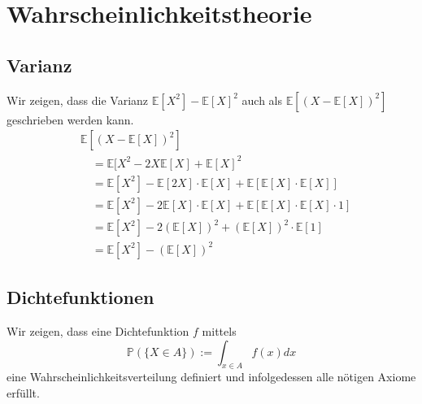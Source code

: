 \section{Wahrscheinlichkeitstheorie}
\subsection{Varianz}
Wir zeigen, dass die Varianz
 $\mathbb{E} [X^2] - \mathbb{E} [X]^2$ auch als $\mathbb{E} [(X- \mathbb{E} [X] )^2 ]$ geschrieben werden kann.	
\begin{align*}
&\mathbb{E} [(X- \mathbb{E} [X] )^2 ] \\
&\quad= \mathbb{E} [X^2 - 2X \mathbb{E} [X] + \mathbb{E} [X]^2 \\
&\quad= \mathbb{E} [X^2] - \mathbb{E} [2X]  \cdot \mathbb{E} [X] + \mathbb{E} [\mathbb{E} [X] \cdot \mathbb{E} [X]]\\
&\quad= \mathbb{E} [X^2] - 2\mathbb{E} [X] \cdot \mathbb{E} [X] +  \mathbb{E} [\mathbb{E} [X] \cdot \mathbb{E} [X] \cdot 1]\\
&\quad= \mathbb{E} [X^2] - 2(\mathbb{E} [X])^2 + (\mathbb{E} [X])^2 \cdot \mathbb{E} [1]\\
&\quad= \mathbb{E} [X^2] - (\mathbb{E} [X])^2
\end{align*}


\subsection{Dichtefunktionen}
Wir zeigen, dass eine Dichtefunktion $f$ mittels
\begin{equation*}
\mathbb{P}(\{X\in A\}):=\int_{x\in A}f(x)dx
\end{equation*}
eine Wahrscheinlichkeitsverteilung definiert und infolgedessen alle nötigen Axiome erfüllt.

